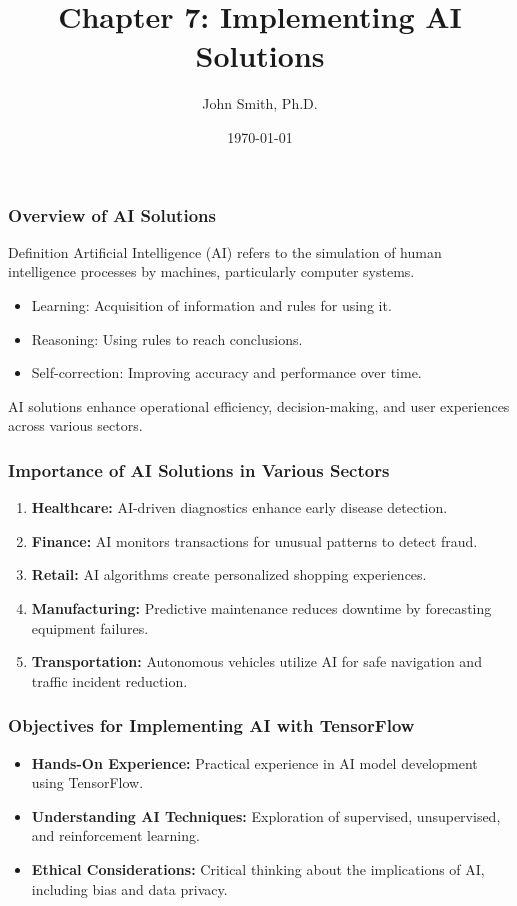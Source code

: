 \documentclass[aspectratio=169]{beamer}
\title[Chapter 7: Implementing AI Solutions]{Chapter 7: Implementing AI Solutions}
\author[J. Smith]{John Smith, Ph.D.}
\institute[University Name]{
  Department of Computer Science\\
  University Name\\
  Email: email@university.edu\\
  Website: www.university.edu
}
\date{\today}
\begin{document}
\frame{\titlepage}

\begin{frame}[fragile]
    \titlepage
\end{frame}

\begin{frame}[fragile]
    \frametitle{Overview of AI Solutions}
    \begin{block}{Definition}
        Artificial Intelligence (AI) refers to the simulation of human intelligence processes by machines, particularly computer systems.
    \end{block}
    \begin{itemize}
        \item Learning: Acquisition of information and rules for using it.
        \item Reasoning: Using rules to reach conclusions.
        \item Self-correction: Improving accuracy and performance over time.
    \end{itemize}
    AI solutions enhance operational efficiency, decision-making, and user experiences across various sectors.
\end{frame}

\begin{frame}[fragile]
    \frametitle{Importance of AI Solutions in Various Sectors}
    \begin{enumerate}
        \item \textbf{Healthcare:} AI-driven diagnostics enhance early disease detection.
        \item \textbf{Finance:} AI monitors transactions for unusual patterns to detect fraud.
        \item \textbf{Retail:} AI algorithms create personalized shopping experiences.
        \item \textbf{Manufacturing:} Predictive maintenance reduces downtime by forecasting equipment failures.
        \item \textbf{Transportation:} Autonomous vehicles utilize AI for safe navigation and traffic incident reduction.
    \end{enumerate}
\end{frame}

\begin{frame}[fragile]
    \frametitle{Objectives for Implementing AI with TensorFlow}
    \begin{itemize}
        \item \textbf{Hands-On Experience:} Practical experience in AI model development using TensorFlow.
        \item \textbf{Understanding AI Techniques:} Exploration of supervised, unsupervised, and reinforcement learning.
        \item \textbf{Ethical Considerations:} Critical thinking about the implications of AI, including bias and data privacy.
    \end{itemize}
\end{frame}
\end{document}
